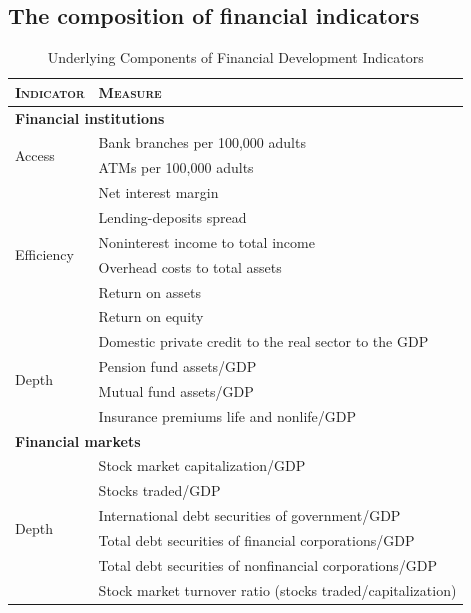 \begin{refsection}
\begin{subappendices}
\subsection{The composition of financial indicators}
\label{ch4subsec:finind_comp}
\begin{table}[ht!]
    \small
    \caption{Underlying Components of Financial Development Indicators}
    \label{ch4tab:finind}
    \centering
    \begin{tabular}{ll}
      \toprule
      \textsc{Indicator} & \textsc{Measure} \\
      \midrule
      \multicolumn{2}{l}{\textbf{Financial institutions}} \\
      \midrule
      \multirow{2}{*}{Access} 	& Bank branches per 100,000 adults \\
                                  & ATMs per 100,000 adults \\
      \midrule
      \multirow{6}{*}{Efficiency}		& Net interest margin \\
                                  & Lending-deposits spread \\ 
                                  & Noninterest income to total income \\
                                  & Overhead costs to total assets \\
                                  & Return on assets \\
                                  & Return on equity \\
            
      \midrule
      \multirow{4}{*}{Depth}	& Domestic private credit to the real sector to the GDP \\
                                  & Pension fund assets/GDP \\
                                  & Mutual fund assets/GDP \\
                                  & Insurance premiums life and nonlife/GDP \\
      \midrule
      \multicolumn{2}{l}{\textbf{Financial markets}} \\
      \midrule
      \multirow{6}{*}{Depth} 	& Stock market capitalization/GDP \\
                                  & Stocks traded/GDP \\
                                  & International debt securities of government/GDP \\
                                  & Total debt securities of financial corporations/GDP \\
                                  & Total debt securities of nonfinancial corporations/GDP \\
      \midrule
      Efficiency                  & Stock market turnover ratio (stocks traded/capitalization) \\
      \bottomrule
    \end{tabular}
\end{table}


\end{subappendices}
\end{refsection}
